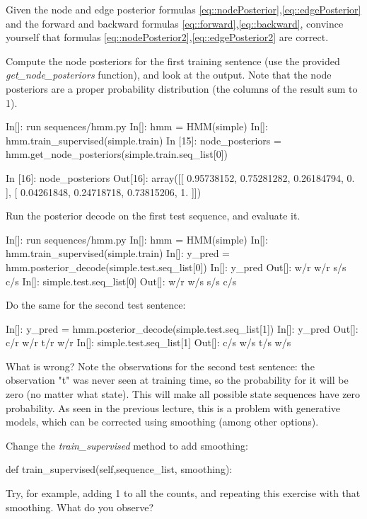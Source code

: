\begin{exercise}
Given the node and edge posterior formulas \ref{eq::nodePosterior},\ref{eq::edgePosterior} and the
  forward and backward formulas \ref{eq::forward},\ref{eq::backward}, convince yourself that formulas
  \ref{eq::nodePosterior2},\ref{eq::edgePosterior2} are correct. 

Compute the node posteriors for the first training sentence (use the provided \emph{get\_node\_posteriors} function), and look at
the output. Note that the node posteriors are a proper
probability distribution (the columns of the result sum to 1).

\begin{python}
In[]:  run sequences/hmm.py
In[]: hmm = HMM(simple)
In[]: hmm.train_supervised(simple.train)
In [15]: node_posteriors = hmm.get_node_posteriors(simple.train.seq_list[0])

In [16]: node_posteriors
Out[16]: 
array([[ 0.95738152,  0.75281282,  0.26184794,  0.        ],
       [ 0.04261848,  0.24718718,  0.73815206,  1.        ]])
\end{python}
\end{exercise}

\begin{exercise}

Run the posterior decode on the first test sequence, and evaluate it.
 
\begin{python}
In[]: run sequences/hmm.py
In[]: hmm = HMM(simple)
In[]: hmm.train_supervised(simple.train)
In[]: y_pred = hmm.posterior_decode(simple.test.seq_list[0])
In[]: y_pred
Out[]: w/r w/r s/s c/s
In[]: simple.test.seq_list[0]
Out[]: w/r w/s s/s c/s
\end{python}

Do the same for the second test sentence:
\begin{python}
In[]: y_pred = hmm.posterior_decode(simple.test.seq_list[1])
In[]: y_pred
Out[]: c/r w/r t/r w/r
In[]: simple.test.seq_list[1]
Out[]: c/s w/s t/s w/s 
\end{python}

What is wrong? Note the observations for the second test sentence: the
observation "t" was never seen at training time, so the probability for
it will be zero (no matter what state). This will make all possible state
sequences have zero probability.
As seen in the previous lecture, this is a problem with generative
models, which can be corrected using smoothing (among other
options).

Change the \emph{train\_supervised} method to add smoothing:
\begin{python}
def train_supervised(self,sequence_list, smoothing):
\end{python}

Try, for example, adding 1 to all the counts, and repeating this exercise with that smoothing. What do you observe?
\end{exercise}

